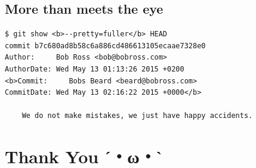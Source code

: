 \documentclass[11pt]{article}
\begin{document}
\subsection*{More than meets the eye}
\label{sec-2-2}
\begin{verbatim}
$ git show <b>--pretty=fuller</b> HEAD
commit b7c680ad8b58c6a886cd486613105ecaae7328e0
Author:     Bob Ross <bob@bobross.com>
AuthorDate: Wed May 13 01:13:26 2015 +0200
<b>Commit:     Bobs Beard <beard@bobross.com>
CommitDate: Wed May 13 02:16:22 2015 +0000</b>

    We do not make mistakes, we just have happy accidents.
\end{verbatim}


\section*{Thank You ˊ・ω・ˋ}
\label{sec-3}
\end{document}
